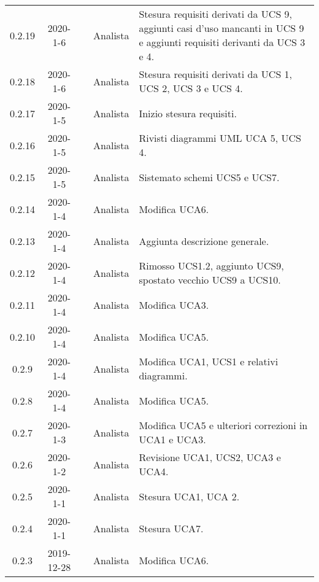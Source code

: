 {\begin{longtable}{ c c  C{4cm}  C{3cm} C{4cm}}
0.2.19 & 2020-1-6 & \DF{} & Analista & Stesura requisiti derivati da UCS 9, aggiunti casi d'uso mancanti in UCS 9 e aggiunti requisiti derivanti da UCS 3 e 4. \\

0.2.18 & 2020-1-6 & \CE{} & Analista & Stesura requisiti derivati da UCS 1, UCS 2, UCS 3 e UCS 4. \\

0.2.17 & 2020-1-5 & \CE{} & Analista & Inizio stesura requisiti. \\

0.2.16 & 2020-1-5 & \DF{} & Analista & Rivisti diagrammi UML UCA 5, UCS 4. \\

0.2.15 & 2020-1-5 & \PF{} & Analista & Sistemato schemi UCS5 e UCS7. \\

0.2.14 & 2020-1-4 & \PF{} & Analista & Modifica UCA6. \\

0.2.13 & 2020-1-4 & \CE{} & Analista & Aggiunta descrizione generale. \\

0.2.12 & 2020-1-4 & \CE{} & Analista & Rimosso UCS1.2, aggiunto UCS9, spostato vecchio UCS9 a UCS10. \\

0.2.11 & 2020-1-4 & \PF{} & Analista & Modifica UCA3. \\

0.2.10 & 2020-1-4 & \DF{} & Analista & Modifica UCA5. \\

0.2.9 & 2020-1-4 & \DF{} & Analista & Modifica UCA1, UCS1 e relativi diagrammi. \\

0.2.8 & 2020-1-4 & \CE{} & Analista & Modifica UCA5. \\

0.2.7 & 2020-1-3 & \CE{} & Analista & Modifica UCA5 e ulteriori correzioni in UCA1 e UCA3. \\

0.2.6 & 2020-1-2 & \CE{} & Analista & Revisione UCA1, UCS2, UCA3 e UCA4. \\

0.2.5 & 2020-1-1 & \BR{} & Analista & Stesura UCA1, UCA 2. \\

0.2.4 & 2020-1-1 & \PF{} & Analista & Stesura UCA7. \\

0.2.3 & 2019-12-28 & \DF{} & Analista & Modifica UCA6. \\


\end{longtable}}
